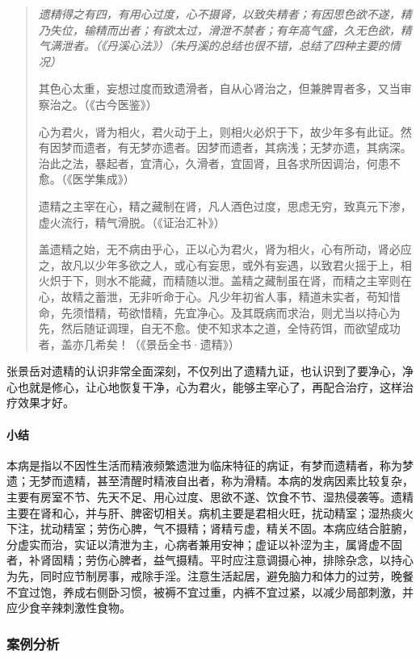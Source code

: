 \begin{quotation}\it
    遗精得之有四，有用心过度，心不摄肾，以致失精者；有因思色欲不遂，精乃失位，输精而出者；有欲太过，滑泄不禁者；有年高气盛，久无色欲，精气满泄者。（《丹溪心法》）（朱丹溪的总结也很不错，总结了四种主要的情况）

    其色心太重，妄想过度而致遗滑者，自从心肾治之，但兼脾胃者多，又当审察治之。（《古今医鉴》）

    心为君火，肾为相火，君火动于上，则相火必炽于下，故少年多有此证。然有因梦而遗者，有无梦亦遗者。因梦而遗者，其病浅；无梦亦遗，其病深。治此之法，暴起者，宜清心，久滑者，宜固肾，且各求所因调治，何患不愈。（《医学集成》）

    遗精之主宰在心，精之藏制在肾，凡人酒色过度，思虑无穷，致真元下渗，虚火流行，精气滑脱。（《证治汇补》）

    盖遗精之始，无不病由乎心，正以心为君火，肾为相火，心有所动，肾必应之，故凡以少年多欲之人，或心有妄思，或外有妄遇，以致君火摇于上，相火炽于下，则水不能藏，而精随以泄。盖精之藏制虽在肾，而精之主宰则在心，故精之蓄泄，无非听命于心。凡少年初省人事，精道未实者，苟知惜命，先须惜精，苟欲惜精，先宜净心。及其既病而求治，则尤当以持心为先，然后随证调理，自无不愈。使不知求本之道，全恃药饵，而欲望成功者，盖亦几希矣！（《景岳全书·遗精》）
\end{quotation}

张景岳对遗精的认识非常全面深刻，不仅列出了遗精九证，也认识到了要净心，净心也就是修心，让心地恢复干净，心为君火，能够主宰心了，再配合治疗，这样治疗效果才好。

\paragraph*{小结}

本病是指以不因性生活而精液频繁遗泄为临床特征的病证，有梦而遗精者，称为梦遗；无梦而遗精，甚至清醒时精液自出者，称为滑精。本病的发病因素比较复杂，主要有房室不节、先天不足、用心过度、思欲不遂、饮食不节、湿热侵袭等。遗精主要在肾和心，并与肝、脾密切相关。病机主要是君相火旺，扰动精室；湿热痰火下注，扰动精室；劳伤心脾，气不摄精；肾精亏虚，精关不固。本病应结合脏腑，分虚实而治，实证以清泄为主，心病者兼用安神；虚证以补涩为主，属肾虚不固者，补肾固精；劳伤心脾者，益气摄精。平时应注意调摄心神，排除杂念，以持心为先，同时应节制房事，戒除手淫。注意生活起居，避免脑力和体力的过劳，晚餐不宜过饱，养成右侧卧习惯，被褥不宜过重，内裤不宜过紧，以减少局部刺激，并应少食辛辣刺激性食物。

\subsubsection{案例分析}

